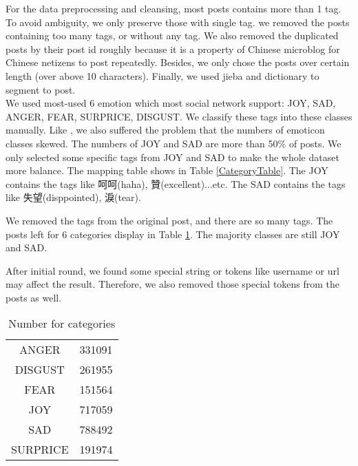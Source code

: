 For the data preprocessing and cleansing, most posts contains more than 1 tag. To avoid ambiguity, we only preserve those with single tag.
we removed the posts containing too many tags, or without any tag. We also removed the duplicated posts by their post id roughly because it is a property of Chinese microblog \cite{fu2013reality} for Chinese netizens to post repeatedly. 
Besides, we only chose the posts over certain length (over above 10 characters). Finally, we used jieba and dictionary to segment to post. \\

We used most-used 6 emotion which most social network support: JOY, SAD, ANGER, FEAR, SURPRICE, DISGUST.
We classify these tags into these classes manually. 
Like \cite{zhao2012moodlens}, we also suffered the problem that the numbers of emoticon classes skewed. The numbers of JOY and SAD are more than 50\% of posts. 
We only selected some specific tags from JOY and SAD to make the whole dataset more balance.   
The mapping table shows in Table \ref{CategoryTable}. The JOY contains the tags like 呵呵(haha), 贊(excellent)...etc. 
The SAD contains the tags like 失望(disppointed), 淚(tear).


We removed the tags from the original post, and there are so many tags. 
The posts left for 6 categories display in Table \ref{cat_num}. The majority classes are still JOY and SAD. 

After initial round, we found some special string or tokens like username or url may affect the result. 
Therefore, we also removed those special tokens from the posts as well.

\begin{table}[]
\centering
\caption{Number for categories}
\label{cat_num}
\begin{tabular}{|c|c|}
\hline
ANGER      &331091 \\                                                           
DISGUST    &261955 \\                                                         
FEAR       &151564 \\                                                         
JOY        &717059 \\                                                           
SAD        &788492 \\                                                           
SURPRICE   &191974 \\
\hline
\end{tabular}
\end{table}


